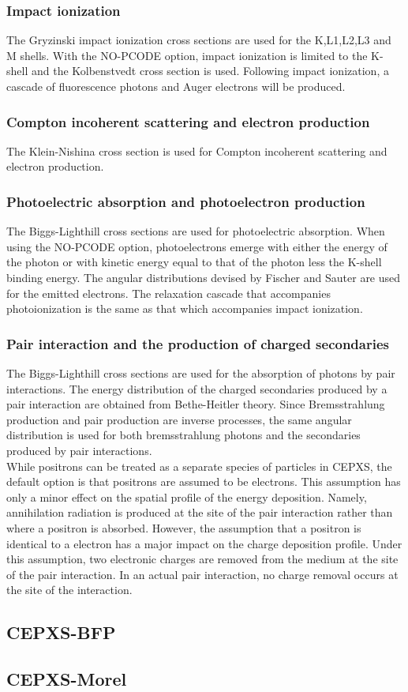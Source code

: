 \subsubsection{Impact ionization}
The Gryzinski impact ionization cross sections are used for the K,L1,L2,L3 and
M shells. With the NO-PCODE option, impact ionization is limited to the
K-shell and the Kolbenstvedt cross section is used. Following impact
ionization, a cascade of fluorescence photons and Auger electrons will be
produced. 

\subsubsection{Compton incoherent scattering and electron production}
The Klein-Nishina cross section is used for Compton incoherent scattering and
electron production. 

\subsubsection{Photoelectric absorption and photoelectron production}
The Biggs-Lighthill cross sections are used for photoelectric absorption. When
using the NO-PCODE option, photoelectrons emerge with either the energy of the
photon or with kinetic energy equal to that of the photon less the K-shell
binding energy. The angular distributions devised by Fischer and Sauter are
used for the emitted electrons. The relaxation cascade that accompanies
photoionization is the same as that which accompanies impact ionization.

\subsubsection{Pair interaction and the production of charged secondaries}
The Biggs-Lighthill cross sections are used for the absorption of photons by
pair interactions. The energy distribution of the charged secondaries produced
by a pair interaction are obtained from Bethe-Heitler theory. Since
Bremsstrahlung production and pair production are inverse processes, the same
angular distribution is used for both bremsstrahlung photons and the
secondaries produced by pair interactions.\\
While positrons can be treated as a separate species of particles in CEPXS,
the default option is that positrons are assumed to be electrons. This
assumption has only a minor effect on the spatial profile of the energy
deposition. Namely, annihilation radiation is produced at the site of the pair 
interaction rather than where a positron is absorbed. However, the
assumption that a positron is identical to a electron has a major impact on
the charge deposition profile. Under this assumption, two electronic charges
are removed from the medium at the site  of the pair interaction. In an actual
pair interaction, no charge removal occurs at the site of the interaction.


\subsection{CEPXS-BFP}
\subsection{CEPXS-Morel}
